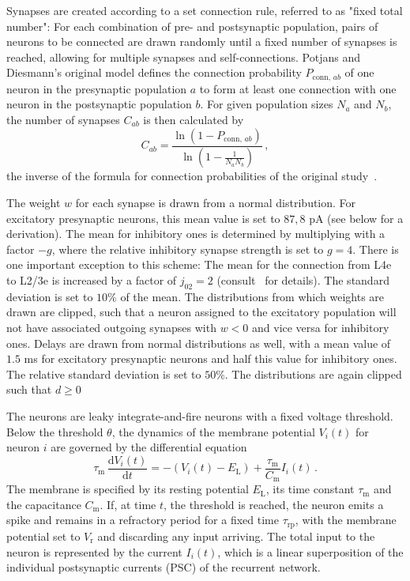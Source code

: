 Synapses are created according to a set connection rule, referred to as 
"fixed total number":
For each combination of pre- and postsynaptic population, pairs of neurons to be connected are drawn
randomly until a fixed number of synapses is reached, 
allowing for multiple synapses and self-connections. 
Potjans and Diesmann's original model defines the connection probability $P_{\text{conn}, \,ab}$ 
of one neuron in the presynaptic population $a$ to form at least one connection with one neuron in 
the postsynaptic population $b$. For given population sizes $N_a$ and $N_b$, the number of 
synapses $C_{ab}$ is then calculated by
\begin{equation}
    C_{ab} = \frac{\ln \left( 1 - P_{\text{conn}, \,ab} \right)}{\ln \left( 1 - \frac{1}{N_a N_b} \right)} \, ,
    \label{eq:synapse_numbers}
\end{equation}
the inverse of the formula for connection probabilities of the original study~\cite{potjans2014}.

The weight $w$ for each synapse is drawn from a normal distribution.
For excitatory presynaptic neurons, this mean value is set to $87,8$ pA (see below for 
a derivation). The mean for inhibitory ones is determined by multiplying 
with a factor $-g$, where the relative inhibitory synapse strength is set to 
$g = 4$. There is one important exception to this scheme:
The mean for the connection from L4e to L2/3e is increased by a factor of 
$j_{02} = 2$ (consult~\cite{potjans2014} for details). 
The standard deviation is set to $10\%$ of the mean. 
The distributions from which weights are drawn are clipped, 
such that a neuron assigned to the excitatory 
population will not have associated outgoing synapses with $w < 0$ 
and vice versa for inhibitory ones. 
Delays are drawn from normal distributions as well, with a mean value 
of $1.5$ ms for excitatory presynaptic neurons and half this value for 
inhibitory ones. The relative standard deviation is set to $50 \%$. The distributions
are again clipped such that $d \ge 0$

The neurons are leaky integrate-and-fire neurons with a fixed voltage threshold. 
Below the threshold $\theta$, the dynamics of the membrane potential $V_i(t)$ 
for neuron $i$ are governed by the differential equation 
\begin{equation}
    \tau_\text{m} \,\frac{\text{d} V_i(t)}{\text{d} t} 
            = -(V_i(t) - E_\text{L}) + \frac{\tau_\text{m}}{C_\text{m}} I_i(t) \, .
    \label{eq:leaky_integrator}
\end{equation}
The membrane is specified by its resting potential $E_\text{L}$, 
its time constant $\tau_\text{m}$ and the capacitance $C_\text{m}$.
If, at time $t$, the threshold is reached, the neuron emits a spike and remains 
in a refractory period for a fixed time $\tau_\text{rp}$, with the membrane 
potential set to $V_\text{r}$ and discarding any input arriving. 
The total input to the neuron is represented by 
the current $I_i(t)$, which is a linear superposition of the individual 
postsynaptic currents (PSC) of the recurrent network.

